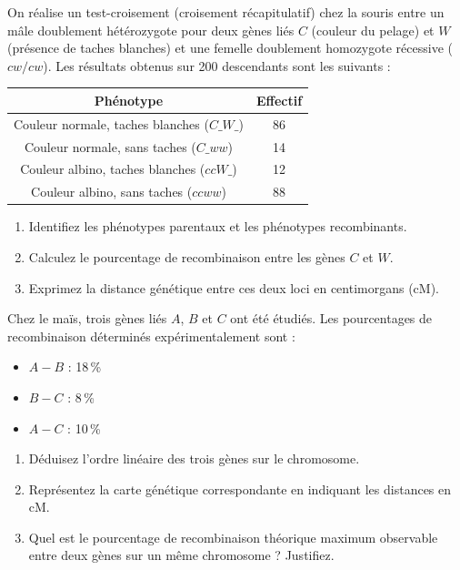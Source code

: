 \documentclass[11pt]{article}
\begin{document}
\begin{exercice}
On réalise un test-croisement (croisement récapitulatif) chez la souris entre un mâle doublement hétérozygote pour deux gènes liés $C$ (couleur du pelage) et $W$ (présence de taches blanches) et une femelle doublement homozygote récessive ($cw/cw$).
Les résultats obtenus sur 200 descendants sont les suivants :
\begin{center}
\begin{tabular}{|c|c|}
\hline
Phénotype & Effectif \\
\hline
Couleur normale, taches blanches ($C\_ W\_$) & 86 \\
Couleur normale, sans taches ($C\_ ww$) & 14 \\
Couleur albino, taches blanches ($cc W\_$) & 12 \\
Couleur albino, sans taches ($cc ww$) & 88 \\
\hline
\end{tabular}
\end{center}
\begin{enumerate}
    \item Identifiez les phénotypes parentaux et les phénotypes recombinants.
    \item Calculez le pourcentage de recombinaison entre les gènes $C$ et $W$.
    \item Exprimez la distance génétique entre ces deux loci en centimorgans (cM).
\end{enumerate}
\end{exercice}

\begin{exercice}
Chez le maïs, trois gènes liés $A$, $B$ et $C$ ont été étudiés. Les pourcentages de recombinaison déterminés expérimentalement sont :
\begin{itemize}
    \item $A - B$ : 18\,\%
    \item $B - C$ : 8\,\%
    \item $A - C$ : 10\,\%
\end{itemize}
\begin{enumerate}
    \item Déduisez l'ordre linéaire des trois gènes sur le chromosome.
    \item Représentez la carte génétique correspondante en indiquant les distances en cM.
    \item Quel est le pourcentage de recombinaison théorique maximum observable entre deux gènes sur un même chromosome ? Justifiez.
\end{enumerate}
\end{exercice}
\end{document}
